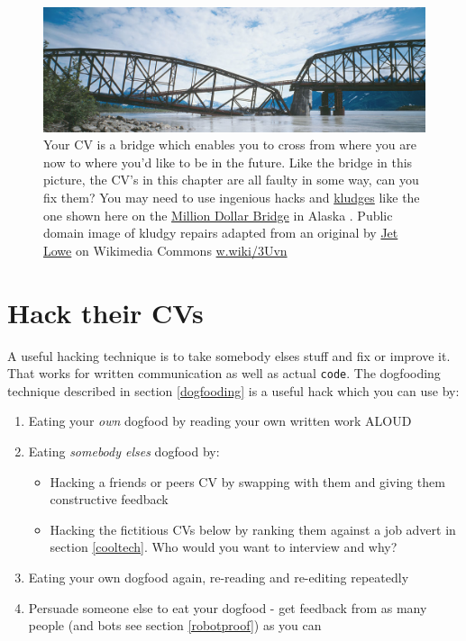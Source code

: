 \documentclass[
]{book}
\providecommand{\tightlist}{%
  \setlength{\itemsep}{0pt}\setlength{\parskip}{0pt}}
\begin{document}
\begin{figure}

{\centering \includegraphics[width=1\linewidth]{images/bridge-kludge-hack} 

}

\caption{Your CV is a bridge which enables you to cross from where you are now to where you'd like to be in the future. Like the bridge in this picture, the CV's in this chapter are all faulty in some way, can you fix them? You may need to use ingenious hacks and \href{https://en.wikipedia.org/wiki/Kludge}{kludges} like the one shown here on the \href{https://en.wikipedia.org/wiki/Miles_Glacier_Bridge}{Million Dollar Bridge} in Alaska . Public domain image of kludgy repairs adapted from an original by \href{https://en.wikipedia.org/wiki/Jet_Lowe}{Jet Lowe} on Wikimedia Commons \href{https://w.wiki/3Uvn}{w.wiki/3Uvn}}\label{fig:kludge-fig}
\end{figure}



\hypertarget{hack-their-cvs}{%
\section{Hack their CVs}\label{hack-their-cvs}}

A useful hacking technique is to take somebody elses stuff and fix or improve it. That works for written communication as well as actual \texttt{code}. The dogfooding technique described in section \ref{dogfooding} is a useful hack which you can use by:

\begin{enumerate}
\def\labelenumi{\arabic{enumi}.}
\tightlist
\item
  Eating your \emph{own} dogfood by reading your own written work ALOUD
\item
  Eating \emph{somebody elses} dogfood by:

  \begin{itemize}
  \tightlist
  \item
    Hacking a friends or peers CV by swapping with them and giving them constructive feedback
  \item
    Hacking the fictitious CVs below by ranking them against a job advert in section \ref{cooltech}. Who would you want to interview and why?
  \end{itemize}
\item
  Eating your own dogfood again, re-reading and re-editing repeatedly
\item
  Persuade someone else to eat your dogfood - get feedback from as many people (and bots see section \ref{robotproof}) as you can
\end{enumerate}
\end{document}
